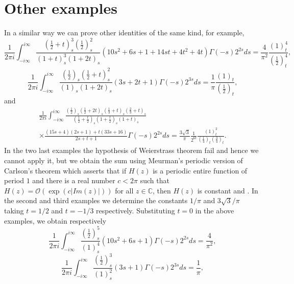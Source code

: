\documentclass[12pt,a4paper]{amsart}
\begin{document}
\section{Other examples}
In a similar way we can prove other identities of the same kind, for example,
\[
\frac{1}{2 \pi i} \int_{-i\infty}^{i\infty} \frac{\left( \frac{1}{2}+t \right)_{\!s}^3 \left( \frac{1}{2} \right)_{\!s}^2 }{(1+t)_{\!s}^3(1+2t)_{\!s}}(10s^2+6s+1+14st+4t^2+4t) \Gamma(-s)2^{2s}ds=\frac{4}{\pi^2} \frac{(1)_t^4}{\left( \frac{1}{2} \right)_t^4},
\]
\[
\frac{1}{2 \pi i} \int_{-i\infty}^{i\infty} \frac{\left( \frac{1}{2} \right)_{\!s} \left( \frac{1}{2}+t \right)_{\!s}^2 }{(1)_{\!s}(1+2t)_{\!s}}(3s+2t+1) \Gamma(-s) 2^{3s}ds=\frac{1}{\pi} \frac{(1)_t}{\left( \frac{1}{2} \right)_t},
\]
and
\begin{multline}\nonumber
\frac{1}{2 \pi i} \int_{-i\infty}^{i\infty}  \frac{\left( \frac{1}{2} \right)_{\!s} \left( \frac{1}{2}+2t \right)_{\!s} \left( \frac{1}{3}+t \right)_{\!s} \left( \frac{2}{3}+t \right)_{\!s}}{\left(\frac{1}{2}+\frac{t}{2}\right)_{\!s}  \left(1+\frac{t}{2}\right)_{\!s} (1+t)_{\!s} } \\ \times \frac{(15s+4)(2s+1)+t(33s+16)}{2s+t+1} \Gamma(-s)2^{2s}ds  = \frac{3\sqrt{3}}{\pi} \frac{1}{2^{6t}} \frac{(1)_t^2}{\left( \frac{1}{4} \right)_t \left( \frac{3}{4} \right)_t}.
\end{multline}
In the two last examples the hypothesis of Weierstrass theorem fail and hence we cannot apply it, but we obtain the sum using Meurman's periodic version of Carlson's theorem \cite[p. 39]{bailey} which asserts that if $H(z)$ is a periodic entire function of period $1$ and there is a real number $c<2\pi$ such that $H(z)=\mathcal{O}(\exp(c |Im(z)|))$ for all $z \in \mathbb{C}$, then $H(z)$ is constant \cite[Appendix]{almkvist} and \cite[Thm. 2.3]{guillera-morehypiden}. In the second and third examples we determine the constants $1/\pi$ and $3 \sqrt{3} / \pi$ taking $t=1/2$ and $t=-1/3$ respectively. Substituting $t=0$ in the above examples, we obtain respectively
\begin{equation}\label{ej1}
\frac{1}{2 \pi i} \int_{-i\infty}^{i\infty} \frac{\left( \frac{1}{2} \right)_{\!s}^5}{(1)_{\!s}^4}(10s^2+6s+1) \Gamma(-s)2^{2s}ds=\frac{4}{\pi^2},
\end{equation}
\begin{equation}\label{ej2}
\frac{1}{2 \pi i} \int_{-i\infty}^{i\infty} \frac{\left( \frac{1}{2} \right)_{\!s}^3}{(1)_{\!s}^2}(3s+1) \Gamma(-s) 2^{3s}ds=\frac{1}{\pi},
\end{equation}
\end{document}
